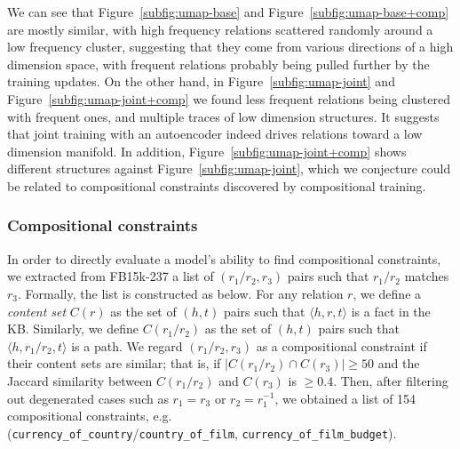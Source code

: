 \documentclass[11pt,a4paper]{article}
\begin{document}
We can see that Figure~\ref{subfig:umap-base} and Figure~\ref{subfig:umap-base+comp} are mostly similar, with high frequency 
relations scattered randomly around a low frequency cluster, suggesting that 
they come from various directions of a high dimension space, with 
frequent relations probably being pulled further by the training updates. 
On the other hand, in Figure~\ref{subfig:umap-joint} and Figure~\ref{subfig:umap-joint+comp} we found less frequent relations being 
clustered with frequent ones, and multiple traces of low dimension 
structures. It suggests that joint training with an autoencoder 
indeed drives relations toward a low dimension manifold. In addition, 
Figure~\ref{subfig:umap-joint+comp} shows different structures against Figure~\ref{subfig:umap-joint}, which we conjecture could be 
related to compositional constraints discovered by compositional training. 





\subsubsection*{Compositional constraints}\label{sec:compositionalconstraints}

In order to directly evaluate a model's ability to find compositional constraints, 
we extracted from FB15k-237 a list of $(r_1/r_2, r_3)$ pairs such that 
$r_1/r_2$ matches $r_3$. Formally, the list is constructed as below. 
For any relation $r$, we define 
a \emph{content set} $C(r)$ as the set of $(h,t)$ pairs such that 
$\langle h,r,t\rangle$ is a fact in the KB. Similarly, we define 
$C(r_1/r_2)$ as the set of $(h,t)$ pairs such that 
$\langle h,r_1/r_2,t\rangle$ is a path.
We regard $(r_1/r_2, r_3)$ as a 
compositional constraint if their content sets are similar; 
that is, 
if $\lvert C(r_1/r_2)\cap C(r_3) \rvert\geq 50$ and 
the Jaccard similarity between $C(r_1/r_2)$ and $C(r_3)$ is $\geq 0.4$. Then, after 
filtering out degenerated cases such as $r_1=r_3$ or $r_2=r_1^{-1}$, we 
obtained a list of 154 compositional constraints, e.g. \\
(\texttt{currency\_of\_country}/\texttt{country\_of\_film}, 
\texttt{currency\_of\_film\_budget}). 
\end{document}
